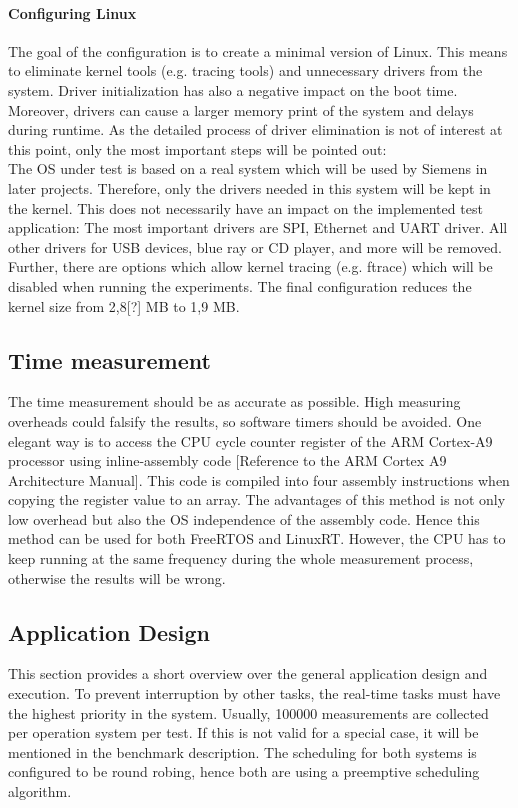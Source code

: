 \paragraph{Configuring Linux}
The goal of the configuration is to create a minimal version of Linux.
This means to eliminate kernel tools (e.g. tracing tools) and unnecessary drivers from the system. 
Driver initialization has also a negative impact on the boot time.
Moreover, drivers can cause a larger memory print of the system and delays during runtime. 
As the detailed process of driver elimination is not of interest at this point, only the most important steps will be pointed out:\\
The \ac{OS} under test is based on a real system which will be used by Siemens in later projects.
Therefore, only the drivers needed in this system will be kept in the kernel.
This does not necessarily have an impact on the implemented test application:
The most important drivers are \ac{SPI}, Ethernet and \ac{UART} driver.
All other drivers for \ac{USB} devices, blue ray or CD player, and more will be removed.
Further, there are options which allow kernel tracing (e.g. ftrace) which will be disabled when running the experiments.  
The final configuration reduces the kernel size from 2,8[?] MB to 1,9 MB. 

\subsection{Time measurement}
The time measurement should be as accurate as possible.
High measuring overheads could falsify the results, so software timers should be avoided. 
One elegant way is to access the \ac{CPU} cycle counter register of the ARM Cortex-A9 processor using inline-assembly code [Reference to the ARM Cortex A9 Architecture Manual].
This code is compiled into four assembly instructions when copying the register value to an array.
The advantages of this method is not only low overhead but also the \ac{OS} independence of the assembly code.
Hence this method can be used for both FreeRTOS and LinuxRT.
However, the \ac{CPU} has to keep running at the same frequency during the whole measurement process, otherwise the results will be wrong.

\subsection{Application Design}
This section provides a short overview over the general application design and execution.
To prevent interruption by other tasks, the real-time tasks must have the highest priority in the system.
Usually, 100000 measurements are collected per operation system per test.
If this is not valid for a special case, it will be mentioned in the benchmark description.
The scheduling for both systems is configured to be round robing, hence both are using a preemptive scheduling algorithm.
 
